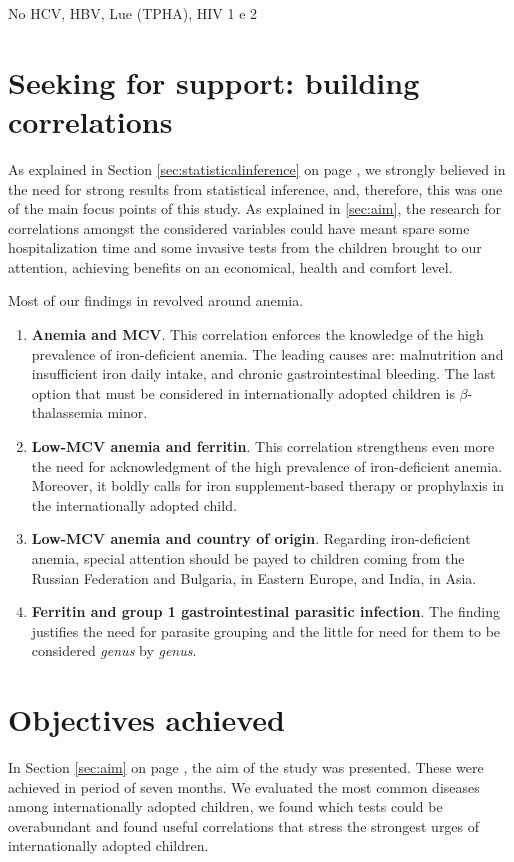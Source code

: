 No HCV, HBV, Lue (TPHA), HIV 1 e 2

\section{Seeking for support: building correlations}\label{sec:seekingforsupport}
As explained in Section \ref{sec:statisticalinference} on page \pageref{sec:statisticalinference}, we strongly believed in the need for strong results from statistical inference, and, therefore, this was one of the main focus points of this study. As explained in \ref{sec:aim}, the research for correlations amongst the considered variables could have meant spare some hospitalization time and some invasive tests from the children brought to our attention, achieving benefits on an economical, health and comfort level.

Most of our findings in revolved around anemia.

\begin{enumerate}
	\item \textbf{Anemia and MCV}. This correlation enforces the knowledge of the high prevalence of iron-deficient anemia. The leading causes are: malnutrition and insufficient iron daily intake, and chronic gastrointestinal bleeding. The last option that must be considered in internationally adopted children is $\beta$-thalassemia minor.
	\item \textbf{Low-MCV anemia and ferritin}. This correlation strengthens even more the need for acknowledgment of the high prevalence of iron-deficient anemia. Moreover, it boldly calls for iron supplement-based therapy or prophylaxis in the internationally adopted child.
	\item \textbf{Low-MCV anemia and country of origin}. Regarding iron-deficient anemia, special attention should be payed to children coming from the Russian Federation and Bulgaria, in Eastern Europe, and India, in Asia.
	\item \textbf{Ferritin and group 1 gastrointestinal parasitic infection}. The finding justifies the need for parasite grouping and the little for need for them to be considered \textit{genus} by \textit{genus}.
\end{enumerate}

\section{Objectives achieved}\label{secd:objectivesachieved}
In Section \ref{sec:aim} on page \pageref{sec:aim}, the aim of the study was presented. These were achieved in period of seven months. We evaluated the most common diseases among internationally adopted children, we found which tests could be overabundant and found useful correlations that stress the strongest urges of internationally adopted children.

